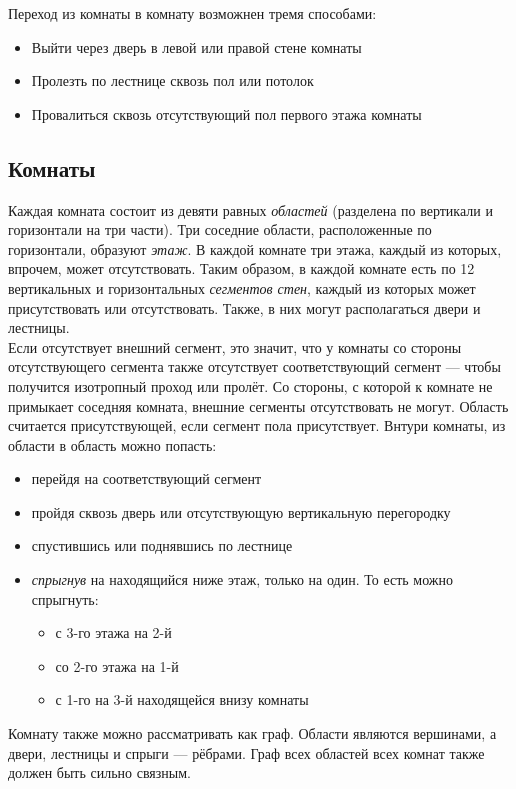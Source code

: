 \documentclass[12pt,a4paper]{article}
\begin{document}
Переход из комнаты в комнату возможнен тремя способами:
\begin{itemize}
\item Выйти через дверь в левой или правой стене комнаты
\item Пролезть по лестнице сквозь пол или потолок
\item Провалиться сквозь отсутствующий пол первого этажа комнаты\\
\end{itemize}

\subsection{Комнаты}
Каждая комната состоит из девяти равных \textit{областей} (разделена по вертикали и горизонтали на три части). Три соседние области, расположенные по горизонтали, образуют \textit{этаж}. В каждой комнате три этажа, каждый из которых, впрочем, может отсутствовать.
Таким образом, в каждой комнате есть по 12 вертикальных и горизонтальных \textit{сегментов стен}, каждый из которых может присутствовать или отсутствовать. Также, в них могут располагаться двери и лестницы.\\
Если отсутствует внешний сегмент, это значит, что у комнаты со стороны отсутствующего сегмента также отсутствует соответствующий сегмент --- чтобы получится изотропный проход или пролёт. Со стороны, с которой к комнате не примыкает соседняя комната, внешние сегменты отсутствовать не могут.
Область считается присутствующей, если сегмент пола присутствует.
Внтури комнаты, из области в область можно попасть:
\begin{itemize}
\item перейдя на соответствующий сегмент
\item пройдя сквозь дверь или отсутствующую вертикальную перегородку
\item спустившись или поднявшись по лестнице
\item \textit{спрыгнув} на находящийся ниже этаж, только на один. То есть можно спрыгнуть:
  \begin{itemize}
  \item с 3-го этажа на 2-й
  \item со 2-го этажа на 1-й
  \item с 1-го на 3-й находящейся внизу комнаты
  \end{itemize}
\end{itemize}

Комнату также можно рассматривать как граф. Области являются вершинами, а двери, лестницы и спрыги --- рёбрами. Граф всех областей всех комнат также должен быть сильно связным.\\
\end{document}
